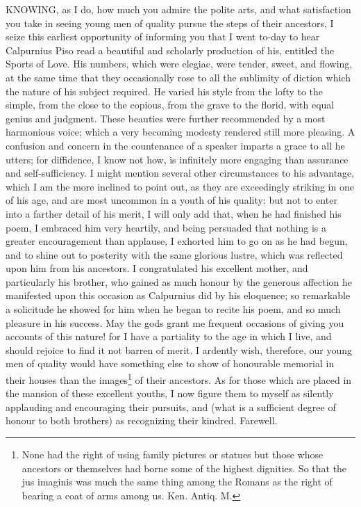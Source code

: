 
KNOWING, as I do, how much you admire the polite arts, and what
satisfaction you take in seeing young men of quality pursue the steps of
their ancestors, I seize this earliest opportunity of informing you that I
went to-day to hear Calpurnius Piso read a beautiful and scholarly
production of his, entitled the Sports of Love. His numbers, which were
elegiac, were tender, sweet, and flowing, at the same time that they
occasionally rose to all the sublimity of diction which the nature of his
subject required. He varied his style from the lofty to the simple, from
the close to the copious, from the grave to the florid, with equal genius
and judgment. These beauties were further recommended by a most harmonious
voice; which a very becoming modesty rendered still more pleasing. A
confusion and concern in the countenance of a speaker imparts a grace to
all he utters; for diffidence, I know not how, is infinitely more engaging
than assurance and self-sufficiency. I might mention several other
circumstances to his advantage, which I am the more inclined to point out,
as they are exceedingly striking in one of his age, and are most uncommon
in a youth of his quality: but not to enter into a farther detail of his
merit, I will only add that, when he had finished his poem, I embraced him
very heartily, and being persuaded that nothing is a greater encouragement
than applause, I exhorted him to go on as he had begun, and to shine out
to posterity with the same glorious lustre, which was reflected upon him
from his ancestors. I congratulated his excellent mother, and particularly
his brother, who gained as much honour by the generous affection he
manifested upon this occasion as Calpurnius did by his eloquence; so
remarkable a solicitude he showed for him when he began to recite his
poem, and so much pleasure in his success. May the gods grant me frequent
occasions of giving you accounts of this nature! for I have a partiality
to the age in which I live, and should rejoice to find it not barren of
merit. I ardently wish, therefore, our young men of quality would have
something else to show of honourable memorial in their houses than the
images\footnote{None had the right of
using family pictures or statues but those whose ancestors or themselves
had borne some of the highest dignities. So that the jus imaginis was much
the same thing among the Romans as the right of bearing a coat of arms
among us. Ken. Antiq. M.}
of their ancestors. As for those which are placed in the mansion of these
excellent youths, I now figure them to myself as silently applauding and
encouraging their pursuits, and (what is a sufficient degree of honour to
both brothers) as recognizing their kindred. Farewell.


